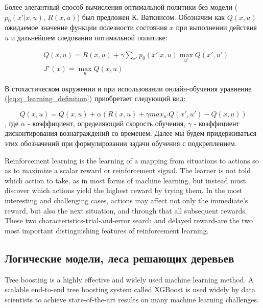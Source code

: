 Более элегантный способ вычисления оптимальной политики без модели ($p_0(x'|x,u)$, $R(x,u)$) был предложен \cite{Watkins:1989} К. Ваткинсом. Обозначим как $Q(x, u)$ ожидаемое значение функции полезности состояния $x$ при выполнении действия $u$ и дальнейшем следовании оптимальной политике:

\begin{equation}
    \label{eq:q_learning_definition}
    \begin{split}
      & Q(x, u) = R(x, u) + \gamma \sum_{x'} {
          p_0(x'|x, u) \max_{u'} Q(x', u')
       }
       \\
      & J^{∗}(x) = \max_{u} Q(x,u)
     \end{split}
\end{equation}

В стохастическом окружении и при использовании онлайн-обучения уравнение (\ref{eq:q_learning_definition}) приобретает следующий вид: 

\begin{equation}
    \label{eq:q_learning_online_stochastic}
    Q(x, u) = Q(x, u) + \alpha(R(x, u) + \gamma max_{u'} Q(x', u') − Q(x, u))
\end{equation},
где $\alpha$ - коэффициент, определяющий скорость обучения, $\gamma$ - коэффициент дисконтирования вознаграждений со временем. Далее мы будем придерживаться этих обозначений при формулировании задачи обучения с подкреплением.



\cite{лаптев2011применение, Magnusson:2012:SCW:2351316.2351327, hung2006applying, nelson2008exploiting, arisholm2007data, nguyen2012timely} 
Reinforcement learning is the learning of a mapping from situations to actions so as to maximize a scalar reward or reinforcement signal. The learner is not told which action to take, as in most forms of machine learning, but instead must discover which actions yield the highest reward by trying them. In the most interesting and challenging cases, actions may affect not only the immediate's reward, but also the next situation, and through that all subsequent rewards. These two characteristics-trial-and-error search and delayed reward-are the two most important distinguishing features of reinforcement learning. \cite{book:963927, sutton1998introduction}



\subsection{Логические модели, леса решающих деревьев}
Tree boosting is a highly effective and widely used machine learning method. A scalable end-to-end tree boosting system called XGBoost is used widely by data scientists to achieve state-of-the-art results on many machine learning challenges. \cite{DBLP:journals/corr/ChenG16} 


